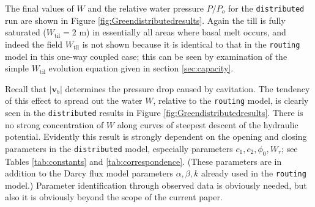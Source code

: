 \documentclass[gmd]{copernicus}   %
\newcommand{\text}{\textrm}
\newcommand\bv{\mathbf{v}}
\newcommand{\Wtil}{W_{\text{til}}}
\begin{document}
The final values of $W$ and the relative water pressure $P/P_o$ for the \texttt{distributed} run are shown in Figure \ref{fig:Greendistributedresults}.  Again the till is fully saturated ($\Wtil=2$ m) in essentially all areas where basal melt occurs, and indeed the field $\Wtil$ is not shown because it is identical to that in the \texttt{routing} model in this one-way coupled case; this can be seen by examination of the simple $\Wtil$ evolution equation given in section \ref{sec:capacity}.

Recall that $|\bv_b|$ determines the pressure drop caused by cavitation.  The tendency of this effect to spread out the water $W$, relative to the \texttt{routing} model, is clearly seen in the \texttt{distributed} results in Figure \ref{fig:Greendistributedresults}.  There is no strong concentration of $W$ along curves of steepest descent of the hydraulic potential.  Evidently this result is strongly dependent on the opening and closing parameters in the \texttt{distributed} model, especially parameters $c_1,c_2,\phi_0,W_r$; see Tables \ref{tab:constants} and \ref{tab:correspondence}.  (These parameters are in addition to the Darcy flux model parameters $\alpha,\beta,k$ already used in the \texttt{routing} model.)  Parameter identification through observed data is obviously needed, but also it is obviously beyond the scope of the current paper.
\end{document}
